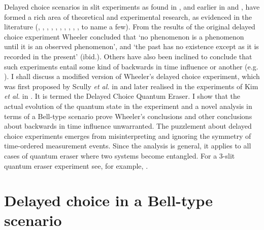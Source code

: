 \documentclass[12pt]{article}
\numberwithin{equation}{section}
\begin{document}
Delayed choice scenarios in slit experiments as found in \cite{wheeler1978past}, and earlier in \cite{von1941deutung} and \cite{bohr1996discussion}, have formed a rich area of theoretical and experimental research, as evidenced in the literature (\!\cite{eichmann1993young}, \cite{englert2000quantitative},  \cite{doi:10.1119/1.19257}, \cite{doi:10.1119/1.19258}, \cite{Kim1999}, \cite{walborn2002double}, \cite{kwiat2004science}, \cite{aharonov2005time},
\cite{Peres2000}, \cite{Egg2013}, to name a few). 
From the results of the original delayed choice experiment Wheeler concluded that  `no phenomenon is a phenomenon until it is an observed phenomenon', and `the past has
no existence except as it is recorded in the present' (ibid.). Others have also been inclined to conclude that such experiments entail some kind of backwards in time influence or another (e.g. \cite{doi:10.1119/1.19258}). I shall discuss a modified version of Wheeler's delayed choice experiment, which was first proposed by  Scully\textit{ et al.} in \cite{scully1982quantum} and later realised in the experiments of Kim \textit{et al.} in \cite{Kim1999}. It is termed the Delayed Choice Quantum Eraser. I show that the actual evolution of the quantum state in the experiment and a novel analysis in terms of a Bell-type scenario prove Wheeler's conclusions and other conclusions about backwards in time influence  unwarranted. The puzzlement about delayed choice experiments emerges from misinterpreting and ignoring the symmetry of time-ordered measurement events.  Since the analysis is general, it applies to all cases of quantum eraser where two systems become entangled. For a 3-slit quantum eraser experiment see, for example, \cite{shah2017quantum}. 


\section{Delayed choice in a Bell-type scenario}
\label{Bell}
\end{document}
